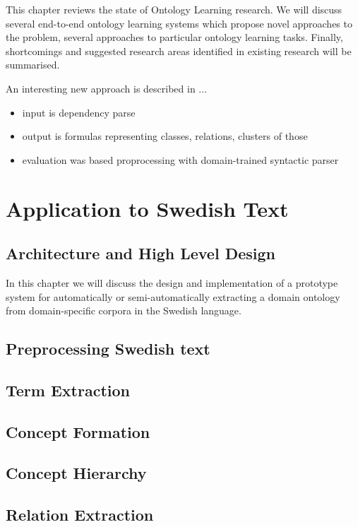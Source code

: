 \documentclass[a4paper]{report}
\begin{document}
This chapter reviews the state of Ontology Learning research.
We will discuss several end-to-end ontology learning systems which propose novel approaches to the problem, several approaches to particular ontology learning tasks.
Finally, shortcomings and suggested research areas identified in existing research will be summarised.

An interesting new approach is described in \cite{Poon2010OntoUSP}...
\begin{itemize}
  \item{input is dependency parse}
  \item{output is formulas representing classes, relations, clusters of those}
  \item{evaluation was based proprocessing with domain-trained syntactic parser}
\end{itemize}

\chapter{Application to Swedish Text}

\section{Architecture and High Level Design}

In this chapter we will discuss the design and implementation of a prototype system for automatically or semi-automatically extracting a domain ontology from domain-specific corpora in the Swedish language.

\section{Preprocessing Swedish text}

\section{Term Extraction}

\section{Concept Formation}

\section{Concept Hierarchy}

\section{Relation Extraction}
\end{document}

